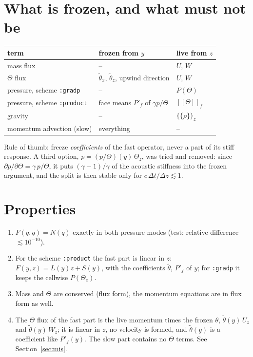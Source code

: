 \documentclass[11pt,a4paper]{article}
\newcommand{\dt}{\Delta t}
\newcommand{\avg}[1]{\{\!\{#1\}\!\}}
\newcommand{\jump}[1]{[\![#1]\!]}
\newcommand{\code}[1]{\texttt{#1}}
\begin{document}
\section{What is frozen, and what must not be}
\begin{center}\small
\begin{tabular}{lll}
\toprule
term & frozen from $y$ & live from $z$\\
\midrule
mass flux & -- & $U$, $W$\\
$\Theta$ flux & $\tilde\theta_x$, $\tilde\theta_z$, upwind direction & $U$, $W$\\
pressure, scheme \code{:gradp} & -- & $P(\Theta)$\\
pressure, scheme \code{:product} & face means $P'_f$ of $\gamma p/\Theta$ & $\jump\Theta_f$\\
gravity & -- & $\avg{\rho}_z$\\
momentum advection (slow) & everything & --\\
\bottomrule
\end{tabular}
\end{center}
Rule of thumb: freeze \emph{coefficients} of the fast operator, never a part of its stiff response. A
third option, $p=(p/\Theta)(y)\,\Theta_z$, was tried and removed: since $\partial p/\partial\Theta=\gamma\,p/\Theta$, it puts
$(\gamma-1)/\gamma$ of the acoustic stiffness into the frozen argument, and the split is then stable only for
$c\,\dt/\Delta z\lesssim1$.

\section{Properties}
\begin{enumerate}
\item $F(q,q)=N(q)$ exactly in both pressure modes (test: relative difference $\lesssim10^{-10}$).
\item For the scheme \code{:product} the fast part is linear in $z$: $F(y,z)=L(y)z+S(y)$, with the coefficients
  $\tilde\theta$, $P'_f$ of $y$; for \code{:gradp} it keeps the cellwise $P(\Theta_z)$.
\item Mass and $\Theta$ are conserved (flux form), the momentum equations are in flux form as well.
\item The $\Theta$ flux of the fast part is the live momentum times the frozen $\theta$,
  $\tilde\theta(y)\,U_z$ and $\tilde\theta(y)\,W_z$; it is linear in $z$, no velocity is formed, and $\tilde\theta(y)$ is a
  coefficient like $P'_f(y)$. The slow part contains no $\Theta$ terms. See Section~\ref{sec:mis}.
\end{enumerate}
\end{document}
